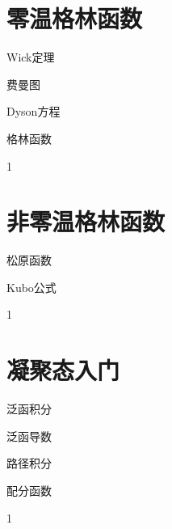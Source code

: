 \documentclass[lang=cn,newtx,10pt,scheme=chinese,thmcnt=section]{elegantbook}
\begin{document}
\chapter{零温格林函数}
\begin{introduction}
	\item Wick定理
	\item 费曼图
	\item Dyson方程
	\item 格林函数
\end{introduction}
1

\chapter{非零温格林函数}
\begin{introduction}
	\item 松原函数
	\item Kubo公式
\end{introduction}
1

\chapter{凝聚态入门}
\begin{introduction}
	\item 泛函积分
	\item 泛函导数
	\item 路径积分
	\item 配分函数
\end{introduction}
1























\nocite{*}

\printbibliography[heading=bibintoc, title=\ebibname]
\appendix
\end{document}
